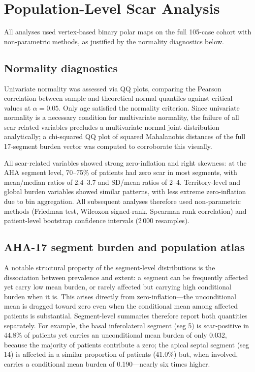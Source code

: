 \FloatBarrier
\section{Population-Level Scar Analysis}

All analyses used vertex-based binary polar maps on the full 105-case cohort with
non-parametric methods, as justified by the normality diagnostics below.

\subsection{Normality diagnostics}

Univariate normality was assessed via QQ plots, comparing the Pearson correlation
between sample and theoretical normal quantiles against critical values at $\alpha = 0.05$.
Only age satisfied the normality criterion. Since univariate normality is a necessary
condition for multivariate normality, the failure of all scar-related variables precludes a
multivariate normal joint distribution analytically; a chi-squared QQ plot of squared
Mahalanobis distances of the full 17-segment burden vector was computed to corroborate
this visually.

All scar-related variables showed strong zero-inflation and right skewness: at the AHA
segment level, 70--75\% of patients had zero scar in most segments, with mean/median
ratios of 2.4--3.7 and SD/mean ratios of 2--4. Territory-level and global burden variables
showed similar patterns, with less extreme zero-inflation due to bin aggregation. All
subsequent analyses therefore used non-parametric methods (Friedman test, Wilcoxon
signed-rank, Spearman rank correlation) and patient-level bootstrap confidence intervals
(2\,000 resamples).

\subsection{AHA-17 segment burden and population atlas}

A notable structural property of the segment-level distributions is the dissociation between
prevalence and extent: a segment can be frequently affected yet carry low mean burden, or
rarely affected but carrying high conditional burden when it is. This arises directly from
zero-inflation---the unconditional mean is dragged toward zero even when the conditional
mean among affected patients is substantial. Segment-level summaries therefore report both
quantities separately. For example, the basal inferolateral segment (seg 5) is scar-positive
in 44.8\% of patients yet carries an unconditional mean burden of only 0.032, because the
majority of patients contribute a zero; the apical septal segment (seg 14) is affected in a
similar proportion of patients (41.0\%) but, when involved, carries a conditional mean burden
of 0.190---nearly six times higher.

